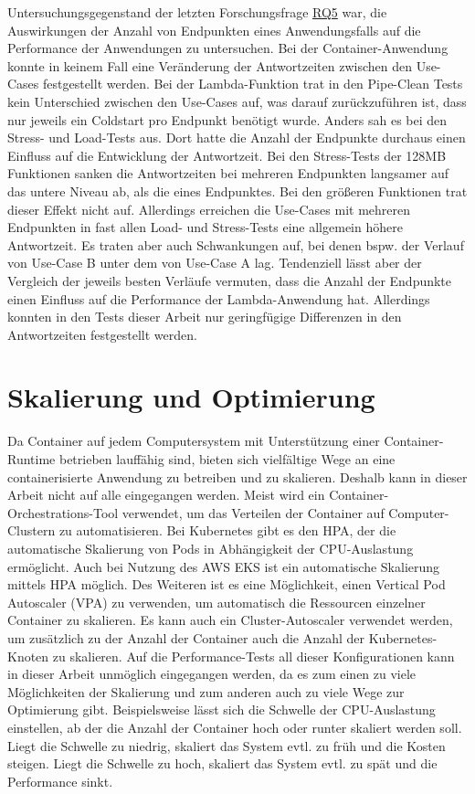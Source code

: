 Untersuchungsgegenstand der letzten Forschungsfrage \hyperref[tab:research-questions]{RQ5} war, die Auswirkungen der Anzahl von Endpunkten eines Anwendungsfalls auf die Performance der Anwendungen zu untersuchen. Bei der Container-Anwendung konnte in keinem Fall eine Veränderung der Antwortzeiten zwischen den Use-Cases festgestellt werden. Bei der Lambda-Funktion trat in den Pipe-Clean Tests kein Unterschied zwischen den Use-Cases auf, was darauf zurückzuführen ist, dass nur jeweils ein Coldstart pro Endpunkt benötigt wurde. 
Anders sah es bei den Stress- und Load-Tests aus. Dort hatte die Anzahl der Endpunkte durchaus einen Einfluss auf die Entwicklung der Antwortzeit. Bei den Stress-Tests der 128MB Funktionen sanken die Antwortzeiten bei mehreren Endpunkten langsamer auf das untere Niveau ab, als die eines Endpunktes. Bei den größeren Funktionen trat dieser Effekt nicht auf. Allerdings erreichen die Use-Cases mit mehreren Endpunkten in fast allen Load- und Stress-Tests eine allgemein höhere Antwortzeit. Es traten aber auch Schwankungen auf, bei denen bspw. der Verlauf von Use-Case B unter dem von Use-Case A lag. Tendenziell lässt aber der Vergleich der jeweils besten Verläufe vermuten, dass die Anzahl der Endpunkte einen Einfluss auf die Performance der Lambda-Anwendung hat. Allerdings konnten in den Tests dieser Arbeit nur geringfügige Differenzen in den Antwortzeiten festgestellt werden. 

\section{Skalierung und Optimierung}
Da Container auf jedem Computersystem mit Unterstützung einer Container-Runtime betrieben lauffähig sind, bieten sich vielfältige Wege an eine containerisierte Anwendung zu betreiben und zu skalieren. Deshalb kann in dieser Arbeit nicht auf alle eingegangen werden. Meist wird ein Container-Orchestrations-Tool verwendet, um das Verteilen der Container auf \linebreak Computer-Clustern zu automatisieren. Bei Kubernetes gibt es den \ac{HPA}, der die automatische Skalierung von Pods in Abhängigkeit der CPU-Auslastung ermöglicht\cite{noauthor_horizontal_nodate}. Auch bei Nutzung des \ac{AWS} \ac{EKS} ist ein automatische Skalierung mittels \ac{HPA} möglich\cite{noauthor_horizontal_nodate-1}. Des Weiteren ist es eine Möglichkeit, einen Vertical Pod Autoscaler (VPA) zu verwenden, um automatisch die Ressourcen einzelner Container zu skalieren\cite{noauthor_vertical_nodate}. Es kann auch ein Cluster-Autoscaler verwendet werden, um zusätzlich zu der Anzahl der Container auch die Anzahl der Kubernetes-Knoten zu skalieren\cite{noauthor_cluster_nodate}.
Auf die Performance-Tests all dieser Konfigurationen kann in dieser Arbeit unmöglich eingegangen werden, da es zum einen zu viele Möglichkeiten der Skalierung und zum anderen auch zu viele Wege zur Optimierung gibt. Beispielsweise lässt sich die Schwelle der CPU-Auslastung einstellen, ab der die Anzahl der Container hoch oder runter skaliert werden soll. Liegt die Schwelle zu niedrig, skaliert das System evtl. zu früh und die Kosten steigen. Liegt die Schwelle zu hoch, skaliert das System evtl. zu spät und die Performance sinkt.

